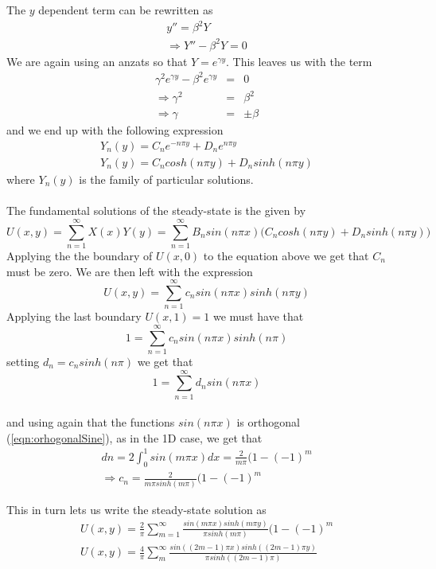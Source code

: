 \documentclass{article}
\begin{document}
The $y$ dependent term can be rewritten as 
\begin{eqnarray}
\nonumber
y'' = \beta^2 Y \\ \nonumber
\Rightarrow Y'' - \beta^2 Y = 0 
\end{eqnarray}
We are again using an anzats so that $Y = e^{\gamma y}$. This leaves us with the term
\begin{eqnarray}
\nonumber
\gamma^2 e^{\gamma y} - \beta^2 e^{\gamma y} &=& 0 \\ \nonumber
\Rightarrow \gamma^2 &=& \beta^2 \\ \nonumber
\Rightarrow \gamma &=& \pm \beta
\end{eqnarray}
and we end up with the following expression
\begin{eqnarray}
Y_n(y) = C_ne^{-n\pi y} + D_ne^{n\pi y} \\ 
Y_n(y) = C_ncosh(n\pi y) + D_nsinh(n\pi y)
\end{eqnarray}
where {$Y_n(y)$} is the family of particular solutions.
\\
\\
The fundamental solutions of the steady-state is the given by
\begin{equation}
U(x,y) = \sum_{n=1}^{\infty} X(x)Y(y) = \sum_{n=1}^{\infty} B_nsin(n\pi x)\Big(C_ncosh(n\pi y) + D_nsinh(n\pi y)\Big)
\end{equation}
Applying the the boundary of $U(x,0)$ to the equation above we get that $C_n$ must be zero. We are then left with the expression
\begin{equation}
 U(x,y) = \sum_{n=1}^{\infty} c_n sin(n\pi x)sinh(n\pi y)
\end{equation}
Applying the last boundary $U(x,1) = 1$ we must have that
\begin{equation}
1 = \sum_{n=1}^{\infty} c_n sin(n\pi x)sinh(n\pi)
\end{equation}
setting $d_n = c_nsinh(n\pi)$ we get that 
\begin{equation}
1 = \sum_{n=1}^{\infty} d_n sin(n\pi x)
\end{equation}
\\
and using again that the functions $sin(n\pi x)$ is orthogonal (\ref{eqn:orhogonalSine}), as in the 1D case, we get that 
\begin{subequations}
\begin{eqnarray}
dn = 2\int_0^1 sin(m\pi x) dx = \frac{2}{m\pi}(1-(-1)^m\\
\Rightarrow c_n = \frac{2}{m\pi sinh(m\pi)}(1-(-1)^m
\end{eqnarray}
\end{subequations}

This in turn lets us write the steady-state solution as 
\begin{subequations}
\begin{eqnarray}
U(x,y) = \frac{2}{\pi} \sum_{m=1}^{\infty} \frac{sin(m\pi x)sinh(m\pi y)}{\pi sinh(m\pi)}(1-(-1)^m \\ 
U(x,y) = \frac{4}{\pi} \sum_{m}^{\infty} \frac{sin((2m-1)\pi x)sinh((2m-1)\pi y)}{\pi sinh((2m-1)\pi)}
\end{eqnarray}
\end{subequations}
\end{document}

